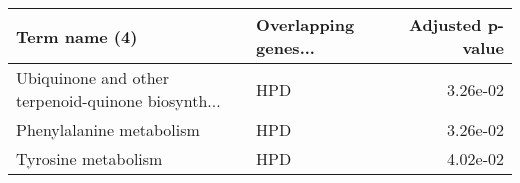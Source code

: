 \begin{tabular}{llr}
\toprule
                                     Term name (4) & Overlapping genes... &  Adjusted p-value \\
\midrule
Ubiquinone and other terpenoid-quinone biosynth... &                  HPD &          3.26e-02 \\
                          Phenylalanine metabolism &                  HPD &          3.26e-02 \\
                               Tyrosine metabolism &                  HPD &          4.02e-02 \\
\bottomrule
\end{tabular}
